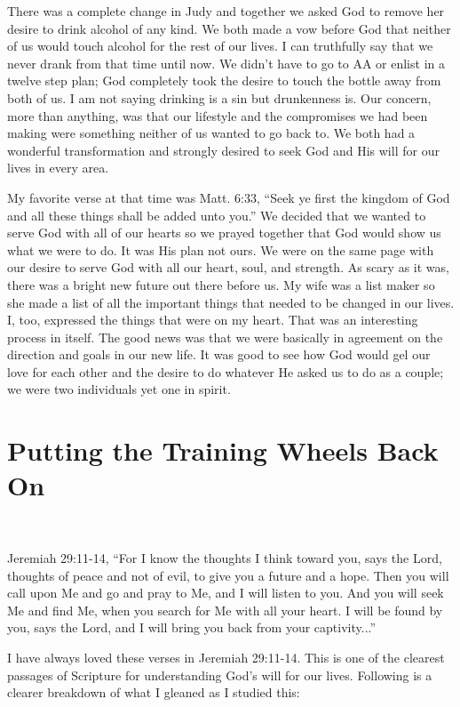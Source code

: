 \documentclass[twoside, 12pt]{book}
\begin{document}
There was a complete change in Judy and together we asked God to remove her desire to drink alcohol of any kind. We both made a vow before God that neither of us would touch alcohol for the rest of our lives. I can truthfully say that we never drank from that time until now. We didn't have to go to AA or enlist in a twelve step plan; God completely took the desire to touch the bottle away from both of us. I am not saying drinking is a sin but drunkenness is. Our concern, more than anything, was that our lifestyle and the compromises we had been making were something neither of us wanted to go back to. We both had a wonderful transformation and strongly desired to seek God and His will for our lives in every area.

My favorite verse at that time was Matt. 6:33, “Seek ye first the kingdom of God and all these things shall be added unto you.” We decided that we wanted to serve God with all of our hearts so we prayed together that God would show us what we were to do. It was His plan not ours. We were on the same page with our desire to serve God with all our heart, soul, and strength. As scary as it was, there was a bright new future out there before us. My wife was a list maker so she made a list of all the important things that needed to be changed in our lives. I, too, expressed the things that were on my heart. That was an interesting process in itself. The good news was that we were basically in agreement on the direction and goals in our new life. It was good to see how God would gel our love for each other and the desire to do whatever He asked us to do as a couple; we were two individuals yet one in spirit.


\section{Putting the Training Wheels Back On}
\

Jeremiah 29:11-14, “For I know the thoughts I think toward you, says the Lord, thoughts of peace and not of evil, to give you a future and a hope. Then you will call upon Me and go and pray to Me, and I will listen to you. And you will seek Me and find Me, when you search for Me with all your heart. I will be found by you, says the Lord, and I will bring you back from your captivity...”

I have always loved these verses in Jeremiah 29:11-14. This is one of the clearest passages of Scripture for understanding God's will for our lives. Following is a clearer breakdown of what I gleaned as I studied this:
	
\end{document}
